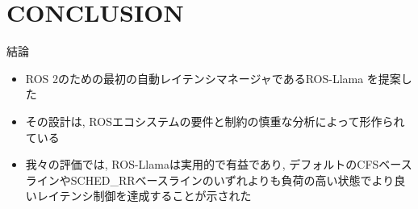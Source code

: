 
\section{CONCLUSION}
\label{sec: conclusion}

\begin{frame}{結論}
    \begin{itemize}
        \item ROS 2のための最初の自動レイテンシマネージャであるROS-Llama を提案した
        \item その設計は, ROSエコシステムの要件と制約の慎重な分析によって形作られている
        \item 我々の評価では, ROS-Llamaは実用的で有益であり, デフォルトのCFSベースラインやSCHED\_RRベースラインのいずれよりも負荷の高い状態でより良いレイテンシ制御を達成することが示された
    \end{itemize}
\end{frame}
